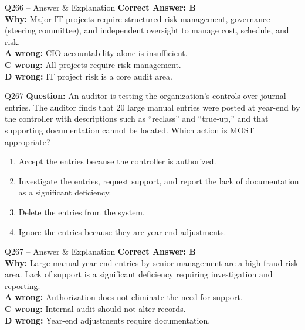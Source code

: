\documentclass[aspectratio=169,10pt]{beamer}
\begin{document}
	\begin{frame}[t]{Q266 -- Answer \& Explanation}
		\small
		\textbf{Correct Answer: B} \\[4pt]
		\textbf{Why:} Major IT projects require structured risk management, governance (steering committee), and independent oversight to manage cost, schedule, and risk. \\[4pt]
		\textbf{A wrong:} CIO accountability alone is insufficient. \\[2pt]
		\textbf{C wrong:} All projects require risk management. \\[2pt]
		\textbf{D wrong:} IT project risk is a core audit area.
	\end{frame}
	
	\begin{frame}[t]{Q267}
		\small
		\textbf{Question:} An auditor is testing the organization's controls over journal entries. The auditor finds that 20 large manual entries were posted at year-end by the controller with descriptions such as ``reclass'' and ``true-up,'' and that supporting documentation cannot be located. Which action is MOST appropriate?
		\begin{enumerate}[label=\Alph*.,itemsep=1pt,topsep=2pt]
			\item Accept the entries because the controller is authorized.
			\item Investigate the entries, request support, and report the lack of documentation as a significant deficiency.
			\item Delete the entries from the system.
			\item Ignore the entries because they are year-end adjustments.
		\end{enumerate}
	\end{frame}
	
	\begin{frame}[t]{Q267 -- Answer \& Explanation}
		\small
		\textbf{Correct Answer: B} \\[4pt]
		\textbf{Why:} Large manual year-end entries by senior management are a high fraud risk area. Lack of support is a significant deficiency requiring investigation and reporting. \\[4pt]
		\textbf{A wrong:} Authorization does not eliminate the need for support. \\[2pt]
		\textbf{C wrong:} Internal audit should not alter records. \\[2pt]
		\textbf{D wrong:} Year-end adjustments require documentation.
	\end{frame}
	
\end{document}
